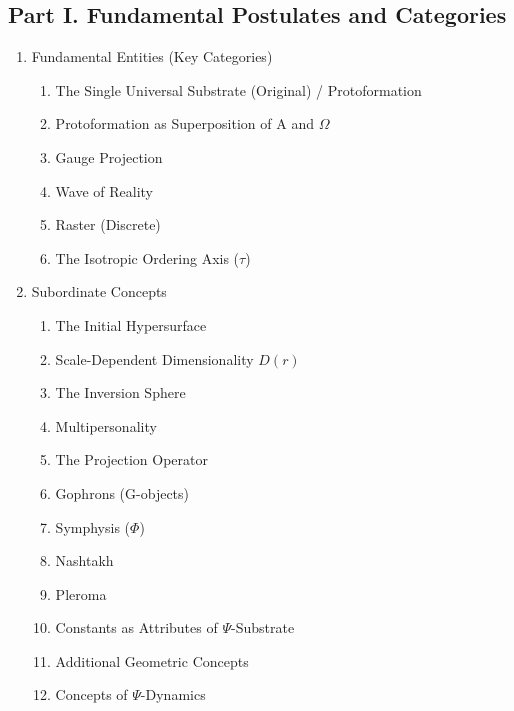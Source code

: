 \documentclass[a4paper,12pt]{article}
\begin{document}
	\subsection*{Part I. Fundamental Postulates and Categories}
	\begin{enumerate}[label=1.\arabic*.]
		\item Fundamental Entities (Key Categories)
		\begin{enumerate}[label=1.1.\arabic*.]
			\item The Single Universal Substrate (Original) / Protoformation
			\item Protoformation as Superposition of A and $\Omega$
			\item Gauge Projection
			\item Wave of Reality
			\item Raster (Discrete)
			\item The Isotropic Ordering Axis ($\tau$)
		\end{enumerate}
		\item Subordinate Concepts
		\begin{enumerate}[label=1.2.\arabic*.]
			\item The Initial Hypersurface
			\item Scale-Dependent Dimensionality $D(r)$
			\item The Inversion Sphere
			\item Multipersonality
			\item The Projection Operator
			\item Gophrons (G-objects)
			\item Symphysis ($\Phi$)
			\item Nashtakh
			\item Pleroma
			\item Constants as Attributes of $\Psi$-Substrate
			\item Additional Geometric Concepts
			\item Concepts of $\Psi$-Dynamics
		\end{enumerate}
	\end{enumerate}
	
\end{document}
